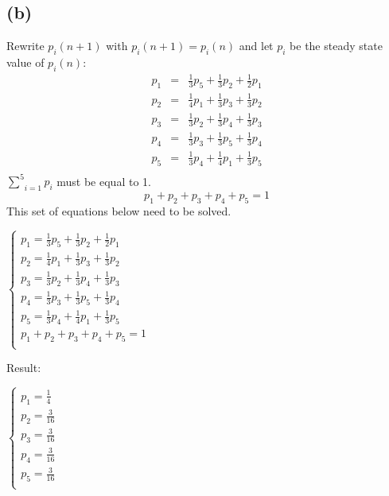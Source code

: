 \documentclass{article} %
\begin{document}
\subsection*{(b)}
Rewrite $p_i(n+1)$ with $p_i(n+1)=p_i(n)$ and let $p_i$ be the steady state value of $p_i(n)$:\\
\[\begin{array}{rcl}
    p_1 &=& \frac{1}{3} p_5 + \frac{1}{3} p_2 + \frac{1}{2}p_1\\
    p_2 &=& \frac{1}{4} p_1 + \frac{1}{3} p_3 + \frac{1}{3}p_2\\
    p_3 &=& \frac{1}{3} p_2 + \frac{1}{3} p_4 + \frac{1}{3}p_3\\
    p_4 &=& \frac{1}{3} p_3 + \frac{1}{3} p_5 + \frac{1}{3}p_4\\
    p_5 &=& \frac{1}{3} p_4 + \frac{1}{4} p_1 + \frac{1}{3}p_5\\
\end{array}\]
$\underset{i=1}{\overset{5}{\sum}}p_i$ must be equal to 1.\\
$$p_1 + p_2 + p_3 + p_4 + p_5 = 1$$
This set of equations below need to be solved.
\begin{center}
    $\begin{cases}
        p_1 = \frac{1}{3} p_5 + \frac{1}{3} p_2 + \frac{1}{2}p_1\\
        p_2 = \frac{1}{4} p_1 + \frac{1}{3} p_3 + \frac{1}{3}p_2\\
        p_3 = \frac{1}{3} p_2 + \frac{1}{3} p_4 + \frac{1}{3}p_3\\
        p_4 = \frac{1}{3} p_3 + \frac{1}{3} p_5 + \frac{1}{3}p_4\\
        p_5 = \frac{1}{3} p_4 + \frac{1}{4} p_1 + \frac{1}{3}p_5\\
        p_1 + p_2 + p_3 + p_4 + p_5 = 1\\
    \end{cases}$
\end{center}
Result:\\
\begin{center}
    $\begin{cases}
        p_1 = \frac{1}{4}\\
        p_2 = \frac{3}{16}\\
        p_3 = \frac{3}{16}\\
        p_4 = \frac{3}{16}\\
        p_5 = \frac{3}{16}\\
    \end{cases}$
\end{center}
\end{document}

